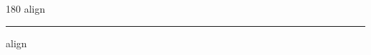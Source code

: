 
\begin{frame}
\begin{center}
\begin{turn}{180}
{\fontsize{2.5cm}{1em}\selectfont align}
\end{turn}
\vspace{1em}\par  
\hrule
\vspace{1em}\par  
{\fontsize{2.5cm}{1em}\selectfont align}
\end{center}
\end{frame}
